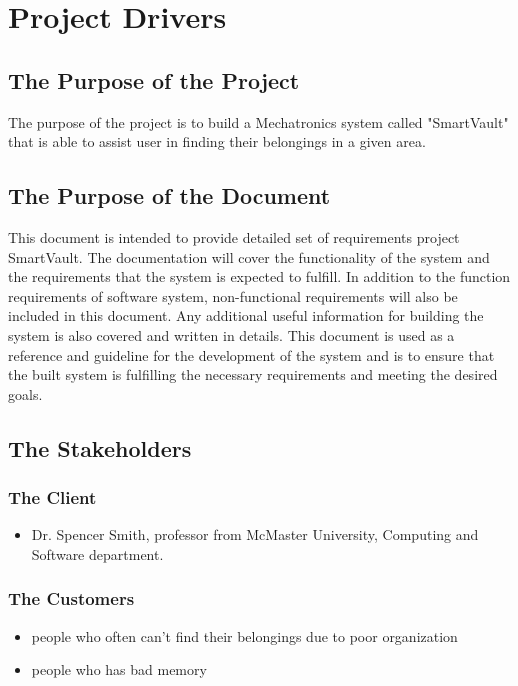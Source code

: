 \documentclass[12pt]{article}
\begin{document}



\begin{table}

\end{table}

\section{Project Drivers}

\subsection{The Purpose of the Project}
The purpose of the project is to build a Mechatronics system called "SmartVault" that is able to assist user in finding their belongings in a given area. 
\subsection{The Purpose of the Document}
This document is intended to provide detailed set of requirements project SmartVault. The documentation will cover the functionality of the system and the requirements that the system is expected to fulfill. In addition to the function requirements of software system, non-functional requirements will also be included in this document. Any additional useful information for building the system is also covered and written in details. This document is used as a reference and guideline for the development of the system and is to ensure that the built system is fulfilling the necessary requirements and meeting the desired goals.
\subsection{The Stakeholders}

\subsubsection{The Client}
\begin{itemize}
    \item Dr. Spencer Smith, professor from McMaster University, Computing and Software department. 
\end{itemize}

\subsubsection{The Customers}
\begin{itemize}
    \item people who often can't find their belongings due to poor organization
   	\item people who has bad memory  
\end{itemize}
\end{document}
